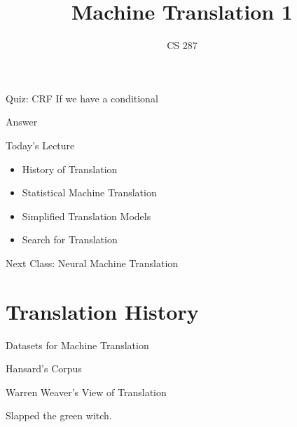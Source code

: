\documentclass{beamer}
\title{Machine Translation 1}
\date{}
\author{CS 287}
\begin{document}
\begin{frame}
  \titlepage
\end{frame}

\begin{frame}
  
\end{frame}

\begin{frame}
  
\end{frame}

\begin{frame}{Quiz: CRF}
  If we have a conditional
\end{frame}

\begin{frame}{Answer}
  
\end{frame}

\begin{frame}{Today's Lecture}
  \begin{itemize}
  \item History of Translation
  \item Statistical Machine Translation 
    \air 

  \item Simplified Translation Models
    \air
 
  \item Search for Translation
  \end{itemize}

  Next Class: Neural Machine Translation
\end{frame}

\section{Translation History}

\begin{frame}{Datasets for Machine Translation}
  
\end{frame}

\begin{frame}{Hansard's Corpus}
  
\end{frame}

\begin{frame}{Warren Weaver's View of Translation}
 
\end{frame}

\begin{frame}
  Slapped the green witch.
\end{frame}
\end{document}
